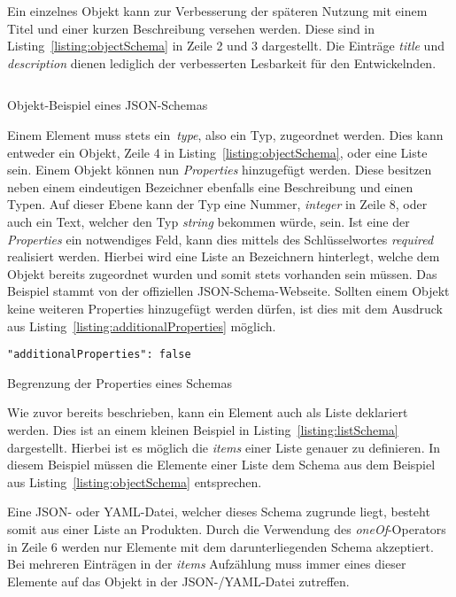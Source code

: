 Ein einzelnes Objekt kann zur Verbesserung der späteren Nutzung mit einem Titel und einer kurzen Beschreibung versehen werden.
Diese sind in Listing~\ref{listing:objectSchema} in Zeile 2 und 3 dargestellt.
Die Einträge \textit{title} und \textit{description} dienen lediglich der verbesserten Lesbarkeit für den Entwickelnden.

\begin{listing}[!ht]
    \inputminted{json}{listings/2.2.1/object.schema.json}
    \caption{Objekt-Beispiel eines JSON-Schemas}
    \label{listing:objectSchema}
\end{listing}

Einem Element muss stets ein~\textit{type}, also ein Typ, zugeordnet werden.
Dies kann entweder ein Objekt, Zeile 4 in Listing~\ref{listing:objectSchema}, oder eine Liste sein.
Einem Objekt können nun \textit{Properties} hinzugefügt werden.
Diese besitzen neben einem eindeutigen Bezeichner ebenfalls eine Beschreibung und einen Typen.
Auf dieser Ebene kann der Typ eine Nummer, \textit{integer} in Zeile 8, oder auch ein Text, welcher den Typ \textit{string} bekommen würde, sein.
Ist eine der \textit{Properties} ein notwendiges Feld, kann dies mittels des Schlüsselwortes \textit{required} realisiert werden.
Hierbei wird eine Liste an Bezeichnern hinterlegt, welche dem Objekt bereits zugeordnet wurden und somit stets vorhanden sein müssen.
Das Beispiel stammt von der offiziellen JSON-Schema-Webseite\cite*{schemaExample}.
Sollten einem Objekt keine weiteren Properties hinzugefügt werden dürfen, ist dies mit dem Ausdruck aus Listing~\ref{listing:additionalProperties} möglich.

\begin{listing}[!ht]
    \begin{verbatim}
"additionalProperties": false
    \end{verbatim}
    \caption{Begrenzung der Properties eines Schemas}
    \label{listing:additionalProperties}
\end{listing}

Wie zuvor bereits beschrieben, kann ein Element auch als Liste deklariert werden.
Dies ist an einem kleinen Beispiel in Listing~\ref{listing:listSchema} dargestellt.
Hierbei ist es möglich die \textit{items} einer Liste genauer zu definieren.
In diesem Beispiel müssen die Elemente einer Liste dem Schema aus dem Beispiel aus Listing~\ref{listing:objectSchema} entsprechen.

Eine JSON- oder YAML-Datei, welcher dieses Schema zugrunde liegt, besteht somit aus einer Liste an Produkten.
Durch die Verwendung des \textit{oneOf}-Operators in Zeile 6 werden nur Elemente mit dem darunterliegenden Schema akzeptiert.
Bei mehreren Einträgen in der \textit{items} Aufzählung muss immer eines dieser Elemente auf das Objekt in der JSON-/YAML-Datei zutreffen.

